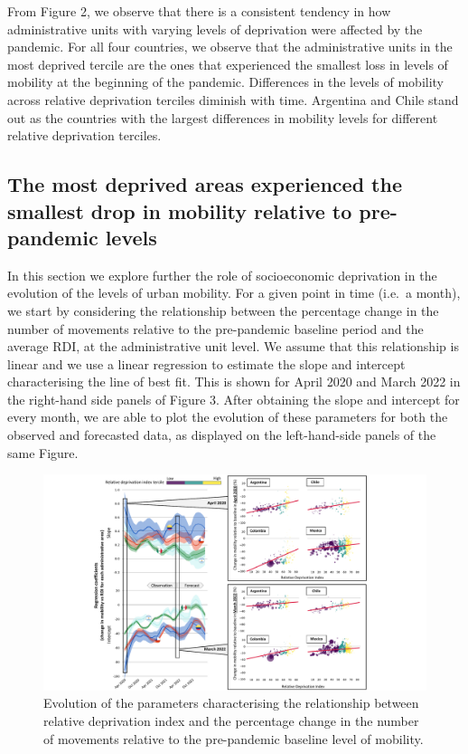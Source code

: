 \documentclass[
  11pt,
]{article}
\begin{document}
From Figure 2, we observe that there is a consistent tendency in how
administrative units with varying levels of deprivation were affected by
the pandemic. For all four countries, we observe that the administrative
units in the most deprived tercile are the ones that experienced the
smallest loss in levels of mobility at the beginning of the pandemic.
Differences in the levels of mobility across relative deprivation
terciles diminish with time. Argentina and Chile stand out as the
countries with the largest differences in mobility levels for different
relative deprivation terciles.

\hypertarget{the-most-deprived-areas-experienced-the-smallest-drop-in-mobility-relative-to-pre-pandemic-levels}{%
\subsection{The most deprived areas experienced the smallest drop in
mobility relative to pre-pandemic
levels}\label{the-most-deprived-areas-experienced-the-smallest-drop-in-mobility-relative-to-pre-pandemic-levels}}

In this section we explore further the role of socioeconomic deprivation
in the evolution of the levels of urban mobility. For a given point in
time (i.e.~a month), we start by considering the relationship between
the percentage change in the number of movements relative to the
pre-pandemic baseline period and the average RDI, at the administrative
unit level. We assume that this relationship is linear and we use a
linear regression to estimate the slope and intercept characterising the
line of best fit. This is shown for April 2020 and March 2022 in the
right-hand side panels of Figure 3. After obtaining the slope and
intercept for every month, we are able to plot the evolution of these
parameters for both the observed and forecasted data, as displayed on
the left-hand-side panels of the same Figure.

\begin{figure}

{\centering \includegraphics{figures/regression-evo-nobackground.pdf}

}

\caption{Evolution of the parameters characterising the relationship
between relative deprivation index and the percentage change in the
number of movements relative to the pre-pandemic baseline level of
mobility.}

\end{figure}
\end{document}
